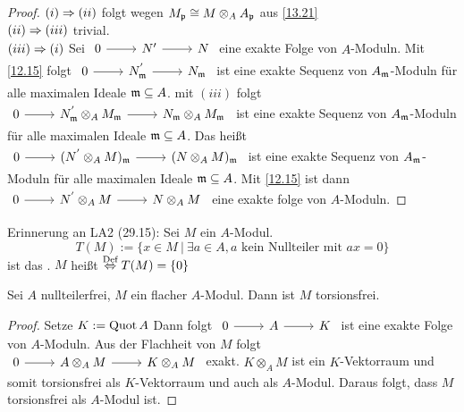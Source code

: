 \begin{proof}
	$(i) \Rightarrow(ii) $ folgt wegen $M_{\mathfrak{p}} \cong M \otimes_A A_{\mathfrak{p}} $ aus \ref{13.21} \\
	$(ii) \Rightarrow(iii) $ trivial.\\
	$(iii) \Rightarrow(i) $ Sei $\begin{tikzcd} 0 \arrow{r} & N' \arrow{r} & N \end{tikzcd}$ eine exakte Folge von $A$-Moduln. Mit \ref{12.15} folgt  $\begin{tikzcd} 0 \arrow{r} & N_{\m}^{'} \arrow{r} & N_{\m} \end{tikzcd}$ ist eine exakte Sequenz von $A_{\mathfrak{m}}$-Moduln für alle maximalen Ideale $\mathfrak{m} \subseteq A $. mit $(iii)$ folgt  $\begin{tikzcd} 0 \arrow{r} & N_{\m}^{'} \otimes_A M_{\m} \arrow{r} & N_{\m} \otimes_A M_{\m} \end{tikzcd}$
	ist eine exakte Sequenz von $A_{\mathfrak{m}}$-Moduln für alle maximalen Ideale $\mathfrak{m} \subseteq A $. Das heißt $\begin{tikzcd} 0 \arrow{r} & (N^{'} \otimes_A M)_{\m} \arrow{r} & ( N \otimes_A M)_{\m} \end{tikzcd}$ ist eine exakte Sequenz von $A_{\mathfrak{m}}$-Moduln für alle maximalen Ideale $\mathfrak{m} \subseteq A $. Mit \ref{12.15} ist dann $\begin{tikzcd} 0 \arrow{r} & N^{'} \otimes_A M \arrow{r} & N \otimes_A M \end{tikzcd}$ eine exakte folge von $A$-Moduln. 
\end{proof}
\begin{anm}
	Erinnerung an LA2 (29.15): Sei $M$ ein $A$-Modul. $$ T(M) := \{ x \in M \ | \ \exists a \in A, a \text{ kein Nullteiler mit } ax = 0 \} $$ ist das .	$M$ heißt  $\overset{\text{Def}}{\Leftrightarrow} T(M) = \{0\}$
\end{anm}
\begin{bem} \label{13.24}
	Sei $A$ nullteilerfrei, $M$ ein flacher $A$-Modul. Dann ist $M$ torsionsfrei. 
\end{bem}
\begin{proof}
	Setze $K := \operatorname{Quot} A$ Dann folgt $\begin{tikzcd} 0 \arrow{r} & A \arrow{r} & K \end{tikzcd}$ ist eine exakte Folge von $A$-Moduln. Aus der Flachheit von $M$ folgt $\begin{tikzcd} 0 \arrow{r} & A  \otimes_A M \arrow{r} & K \otimes_A M \end{tikzcd}$ exakt. $K \otimes_A M $ ist ein $K$-Vektorraum und somit torsionsfrei als $K$-Vektorraum und auch als $A$-Modul. Daraus folgt, dass $M$ torsionsfrei als $A$-Modul ist.
\end{proof}
